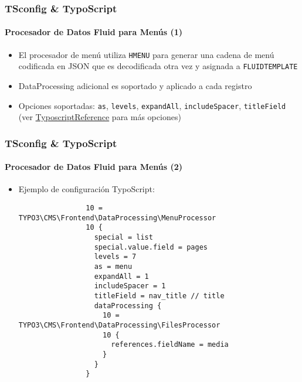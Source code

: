 \begin{frame}[fragile]
	\frametitle{TSconfig \& TypoScript}
	\framesubtitle{Procesador de Datos Fluid para Menús (1)}

	\begin{itemize}
		\item El procesador de menú utiliza \texttt{HMENU} para generar una cadena de menú codificada en JSON
			que es decodificada otra vez y asignada a \texttt{FLUIDTEMPLATE}
		\item DataProcessing adicional es soportado y aplicado a cada registro
		\item Opciones soportadas: \texttt{as}, \texttt{levels}, \texttt{expandAll}, \texttt{includeSpacer},
			\texttt{titleField}
			(ver \href{https://docs.typo3.org/typo3cms/TyposcriptReference/ContentObjects/Hmenu/Index.html}{TyposcriptReference} para más opciones)
	\end{itemize}

\end{frame}

\begin{frame}[fragile]
	\frametitle{TSconfig \& TypoScript}
	\framesubtitle{Procesador de Datos Fluid para Menús (2)}

	\lstset{basicstyle=\tiny\ttfamily}

	\begin{itemize}
		\item Ejemplo de configuración TypoScript:

			\begin{lstlisting}
				10 = TYPO3\CMS\Frontend\DataProcessing\MenuProcessor
				10 {
				  special = list
				  special.value.field = pages
				  levels = 7
				  as = menu
				  expandAll = 1
				  includeSpacer = 1
				  titleField = nav_title // title
				  dataProcessing {
				    10 = TYPO3\CMS\Frontend\DataProcessing\FilesProcessor
				    10 {
				      references.fieldName = media
				    }
				  }
				}
			\end{lstlisting}

	\end{itemize}

\end{frame}

